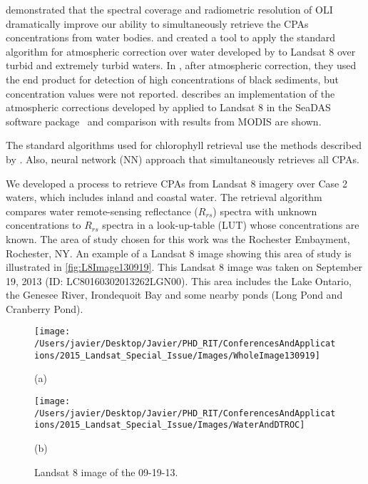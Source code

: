 \documentclass[onecolumn,3p]{elsarticle}
\begin{document}
\cite*{Gerace:2013} demonstrated that the spectral coverage and radiometric resolution of OLI dramatically improve our ability to simultaneously retrieve the CPAs concentrations from water bodies. \cite{Vanhellemont2014} and \cite{Vanhellemont:2015} created a tool to apply the standard algorithm for atmospheric correction over water developed by \cite{Gordon:1994} to Landsat 8 over turbid and extremely turbid waters. In \cite{Vanhellemont:2015}, after atmospheric correction, they used the end product for detection of high concentrations of black sediments, but concentration values were not reported. \cite{Franz:2015} describes an implementation of the atmospheric corrections developed by \cite{Gordon:1994} applied to Landsat 8 in the SeaDAS software package~ and comparison with results from MODIS are shown.

The standard algorithms used for chlorophyll retrieval use the methods described by \cite{OReilly2000}. Also, neural network (NN) approach \cite{Kallio:2015} that simultaneously retrieves all CPAs.

We developed a process to retrieve CPAs from Landsat 8 imagery over Case 2 waters, which includes inland and coastal water. The retrieval algorithm compares water remote-sensing reflectance ($R_{rs}$) spectra with unknown concentrations to $R_{rs}$ spectra in a look-up-table (LUT) whose concentrations are known. The area of study chosen for this work was the Rochester Embayment, Rochester, NY. An example of a Landsat 8 image showing this area of study is illustrated in \autoref{fig:L8Image130919}. This Landsat 8 image was taken on September 19, 2013 (ID: LC80160302013262LGN00). This area includes the Lake Ontario, the Genesee River, Irondequoit Bay and some nearby ponds (Long Pond and Cranberry Pond).

\begin{figure}[htb]
  	\begin{minipage}[c]{0.48\linewidth}
    	\centering
    	\texttt{[image: /Users/javier/Desktop/Javier/PHD\_RIT/ConferencesAndApplications/2015\_Landsat\_Special\_Issue/Images/WholeImage130919]}
    	\centerline{(a)}\medskip
  	\end{minipage}
  	\hfill
  	\begin{minipage}[d]{0.48\linewidth}
    	\centering
    	\texttt{[image: /Users/javier/Desktop/Javier/PHD\_RIT/ConferencesAndApplications/2015\_Landsat\_Special\_Issue/Images/WaterAndDTROC]}
    	\centerline{(b)}\medskip
    \end{minipage}	

    \caption{Landsat 8 image of the 09-19-13.  \label{fig:L8Image130919} }
\end{figure}
\end{document}

